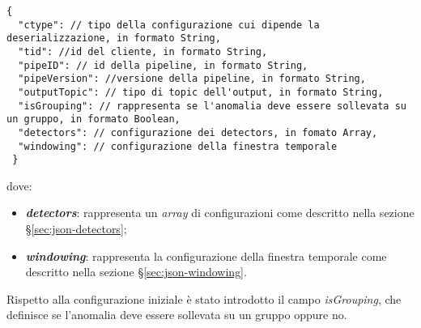 \begin{verbatim}
{
  "ctype": // tipo della configurazione cui dipende la deserializzazione, in formato String,
  "tid": //id del cliente, in formato String, 
  "pipeID": // id della pipeline, in formato String, 
  "pipeVersion": //versione della pipeline, in formato String,
  "outputTopic": // tipo di topic dell'output, in formato String,
  "isGrouping": // rappresenta se l'anomalia deve essere sollevata su un gruppo, in formato Boolean,
  "detectors": // configurazione dei detectors, in fomato Array,
  "windowing": // configurazione della finestra temporale
 }
\end{verbatim}
dove:
\begin{itemize}
	\item{\textbf{\textit{detectors}}: rappresenta un \textit{array} di configurazioni come descritto nella sezione \S\ref{sec:json-detectors}};
	\item{\textbf{\textit{windowing}}: rappresenta la configurazione della finestra temporale come descritto nella sezione \S\ref{sec:json-windowing}.}
\end{itemize}

Rispetto alla configurazione iniziale è stato introdotto il campo \textit{isGrouping}, che definisce se l'anomalia deve essere sollevata su un gruppo oppure no.

